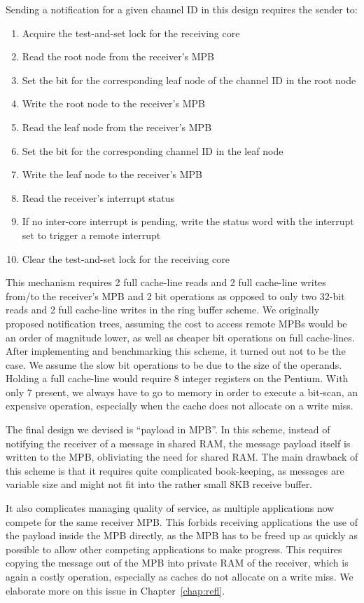 \documentclass[a4paper,twoside]{report} %
\begin{document}
Sending a notification for a given channel ID in this design requires
the sender to:

\begin{enumerate}
\item Acquire the test-and-set lock for the receiving core
\item Read the root node from the receiver's MPB
\item Set the bit for the corresponding leaf node of the channel ID
  in the root node
\item Write the root node to the receiver's MPB
\item Read the leaf node from the receiver's MPB
\item Set the bit for the corresponding channel ID in the leaf node
\item Write the leaf node to the receiver's MPB
   \item Read the receiver's interrupt status
   \item If no inter-core interrupt is pending, write the status word
     with the interrupt set to trigger a remote interrupt
\item Clear the test-and-set lock for the receiving core
\end{enumerate}

This mechanism requires 2 full cache-line reads and 2 full cache-line
writes from/to the receiver's MPB and 2 bit operations as opposed to
only two 32-bit reads and 2 full cache-line writes in the ring buffer
scheme. We originally proposed notification trees, assuming the cost
to access remote MPBs would be an order of magnitude lower, as well as
cheaper bit operations on full cache-lines. After implementing and
benchmarking this scheme, it turned out not to be the case. We assume
the slow bit operations to be due to the size of the operands. Holding
a full cache-line would require 8 integer registers on the Pentium.
With only 7 present, we always have to go to memory in order to
execute a bit-scan, an expensive operation, especially when the cache
does not allocate on a write miss.

The final design we devised is ``payload in MPB''. In this scheme,
instead of notifying the receiver of a message in shared RAM, the
message payload itself is written to the MPB, obliviating the need for
shared RAM. The main drawback of this scheme is that it requires quite
complicated book-keeping, as messages are variable size and might not
fit into the rather small 8KB receive buffer.

It also complicates managing quality of service, as multiple
applications now compete for the same receiver MPB. This forbids
receiving applications the use of the payload inside the MPB directly,
as the MPB has to be freed up as quickly as possible to allow other
competing applications to make progress. This requires copying the
message out of the MPB into private RAM of the receiver, which is
again a costly operation, especially as caches do not allocate on a
write miss. We elaborate more on this issue in
Chapter~\ref{chap:refl}.
\end{document}
